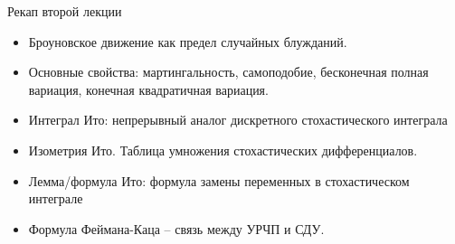 \documentclass[aspectratio=169]{beamer}
\begin{document}
\begin{frame}{Рекап второй лекции}
    \begin{itemize}
        \item Броуновское движение как предел случайных блужданий. 
        \item Основные свойства: мартингальность, самоподобие, бесконечная полная вариация, конечная квадратичная вариация.
        \item Интеграл Ито: непрерывный аналог дискретного стохастического интеграла
        \item Изометрия Ито. Таблица умножения стохастических дифференциалов.
        \item Лемма/формула Ито: формула замены переменных в стохастическом интеграле
        \item Формула Феймана-Каца -- связь между УРЧП и СДУ.
    \end{itemize}
\end{frame}
\end{document}

